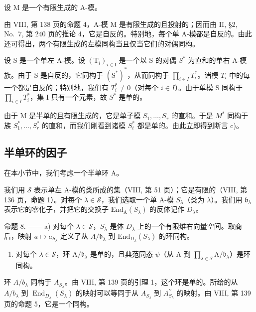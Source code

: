 设 \(\mathrm{M}\) 是一个有限生成的 A-模。

由 VIII, 第 138 页的命题 4，A-模 M 是有限生成的且投射的；因而由 II, §2, No.~7, 第 240 页的推论 4，它是自反的。特别地，每个单 A-模都是自反的。由此还可得出，两个有限生成的左模同构当且仅当它们的对偶同构。

设 S 是一个单左 A-模。设 \((\mathrm{T}_{i})_{i\in\mathrm{I}}\) 是一个以 S 的对偶 \(S^{*}\) 为直和的单右 A-模族。由于 S 是自反的，它同构于 \((\mathrm{S}^{*})^{*}\)，从而同构于 \(\prod_{i\in I}T_{i}^{*}\)。诸模 \(T_{i}\) 中的每一个都是自反的；特别地，我们有 \(T_{i}^{*}\neq0\)（对每个 \(i\in I\)）。由于单模 S 同构于 \(\prod_{i\in I}T_{i}^{*}\)，集 I 只有一个元素，故 \(S^{*}\) 是单的。

由于 M 是半单的且有限生成的，它是单子模 \(S_{1},\ldots,S_{r}\) 的直和。于是 \(M^{*}\) 同构于族 \(S_{1}^{*},\ldots,S_{r}^{*}\) 的直和，而我们刚看到诸模 \(S_{i}^{*}\) 都是单的。由此立即得到断言 c)。

\subsection{半单环的因子}

在本小节中，我们考虑一个半单环 A。

我们用 \(\mathcal{S}\) 表示单左 A-模的类所成的集（VIII, 第 51 页）；它是有限的（VIII, 第 136 页，命题 1）。对每个 \(\lambda \in \mathcal{S}\)，我们选取一个单 A-模 \(S_{\lambda}\)（类为 \(\lambda\)）。我们用 \(\mathfrak{b}_{\lambda}\) 表示它的零化子，并把它的交换子 \(\mathrm{End}_{\mathrm{A}}(S_{\lambda})\) 的反体记作 \(D_{\lambda}\)。

命题 8. —— a) 对每个 \(\lambda \in \mathcal{S}\)，\(S_{\lambda}\) 是体 \(D_{\lambda}\) 上的一个有限维右向量空间。取商后，映射 \(a \mapsto a_{S_{\lambda}}\) 定义了从 \(A / \mathfrak{b}_{\lambda}\) 到 \(\mathrm{End}_{D_{\lambda}}(S_{\lambda})\) 的环同构。

\begin{enumerate}
\def\labelenumi{\alph{enumi})}
\setcounter{enumi}{1}
\tightlist
\item
  对每个 \(\lambda \in \mathcal{S}\)，环 \(\mathrm{A} / \mathfrak{b}_{\lambda}\) 是单的，且典范同态 \(\psi\)（从 \(\mathrm{A}\) 到 \(\prod_{\lambda \in \mathcal{S}}\mathrm{A} / \mathfrak{b}_{\lambda}\)）是环同构。
\end{enumerate}

环 \(A/b_{\lambda}\) 同构于 \(A_{S_{\lambda}}\)。由 VIII, 第 139 页的引理 1，这个环是单的。所给的从 \(A/b_{\lambda}\) 到 \(\operatorname{End}_{D_{\lambda}}(S_{\lambda})\) 的映射可以等同于从 \(A_{S_{\lambda}}\) 到 \(A_{S_{\lambda}}^{\prime\prime}\) 的映射。由 VIII, 第 139 页的命题 5，它是一个同构。

